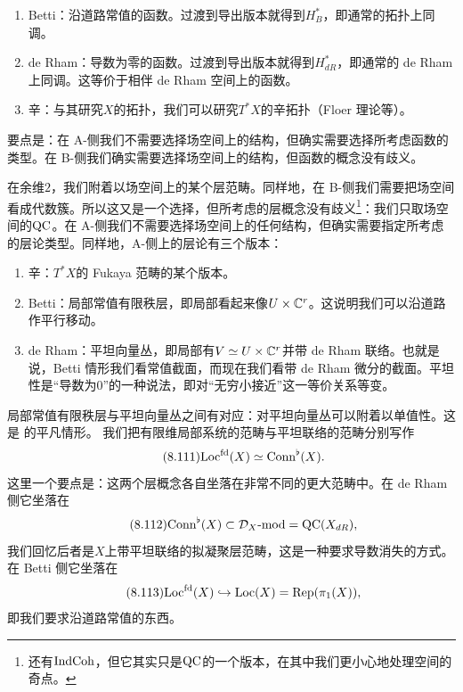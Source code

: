 \begin{enumerate}
\item Betti：沿道路常值的函数。过渡到导出版本就得到$H^{*}_{B}$，即通常的拓扑上同调。
\item de Rham：导数为零的函数。过渡到导出版本就得到$H^{*}_{dR}$，即通常的 de Rham 上同调。这等价于相伴 de Rham 空间上的函数。
\item 辛：与其研究$X$的拓扑，我们可以研究$T^{*}X$的辛拓扑（Floer 理论等）。
\end{enumerate}

要点是：在 A-侧我们不需要选择场空间上的结构，但确实需要选择所考虑函数的类型。在 B-侧我们确实需要选择场空间上的结构，但函数的概念没有歧义。

在余维$2$，我们附着以场空间上的某个层范畴。同样地，在 B-侧我们需要把场空间看成代数簇。所以这又是一个选择，但所考虑的层概念没有歧义\footnote{还有$\mathrm{IndCoh}$，但它其实只是$\mathrm{QC}$的一个版本，在其中我们更小心地处理空间的奇点。}：我们只取场空间的$\mathrm{QC}$。在 A-侧我们不需要选择场空间上的任何结构，但确实需要指定所考虑的层论类型。同样地，A-侧上的层论有三个版本：

\begin{enumerate}
\item[3.] 辛：$T^{*}X$的 Fukaya 范畴的某个版本。
\item[1.] Betti：局部常值有限秩层，即局部看起来像$U\times\mathbb{C}^{r}$。这说明我们可以沿道路作平行移动。
\item[2.] de Rham：平坦向量丛，即局部有$V\simeq U\times\mathbb{C}^{r}$并带 de Rham 联络。也就是说，Betti 情形我们看常值截面，而现在我们看带 de Rham 微分的截面。平坦性是“导数为$0$”的一种说法，即对“无穷小接近”这一等价关系等变。
\end{enumerate}

局部常值有限秩层与平坦向量丛之间有对应：对平坦向量丛可以附着以单值性。这是  的平凡情形。
我们把有限维局部系统的范畴与平坦联络的范畴分别写作
\begin{equation}\tag{8.111}
\mathrm{Loc}^{\mathrm{fd}}(X)\simeq\mathrm{Conn}^{\flat}(X).
\end{equation}
这里一个要点是：这两个层概念各自坐落在非常不同的更大范畴中。在 de Rham 侧它坐落在
\begin{equation}\tag{8.112}
\mathrm{Conn}^{\flat}(X)\subset\mathcal D_X\text{-mod}=\mathrm{QC}(X_{dR}),
\end{equation}
我们回忆后者是$X$上带平坦联络的拟凝聚层范畴，这是一种要求导数消失的方式。在 Betti 侧它坐落在
\begin{equation}\tag{8.113}
\mathrm{Loc}^{\mathrm{fd}}(X)\hookrightarrow\mathrm{Loc}(X)=\mathrm{Rep}(\pi_1(X)),
\end{equation}
即我们要求沿道路常值的东西。

